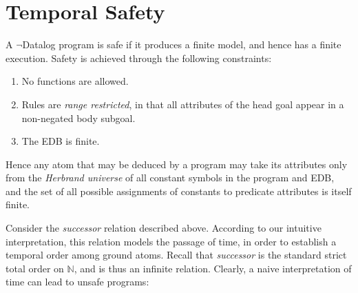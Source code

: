 \section{Temporal Safety}

A $\lnot$Datalog program is safe if it produces a finite model, and hence has a finite execution.  Safety is achieved through the following
constraints:

\begin{enumerate}
\item No functions are allowed.
\item Rules are \emph{range restricted}, in that all attributes of the head goal appear in a non-negated body subgoal.
\item The EDB is finite.
\end{enumerate}

Hence any atom that may be deduced by a program may take its attributes only from the \emph{Herbrand universe} of
all constant symbols in the program and EDB, and the set of all possible assignments of constants to predicate attributes
is itself finite.  

Consider the \emph{successor} relation described above.  According to our intuitive interpretation, this relation models
the passage of time, in order to establish a temporal order among ground atoms.  
Recall that {\em successor} is the standard strict total order on $\mathbb{N}$,
and is thus an infinite relation.  Clearly, a naive interpretation of time can
lead to unsafe programs:







